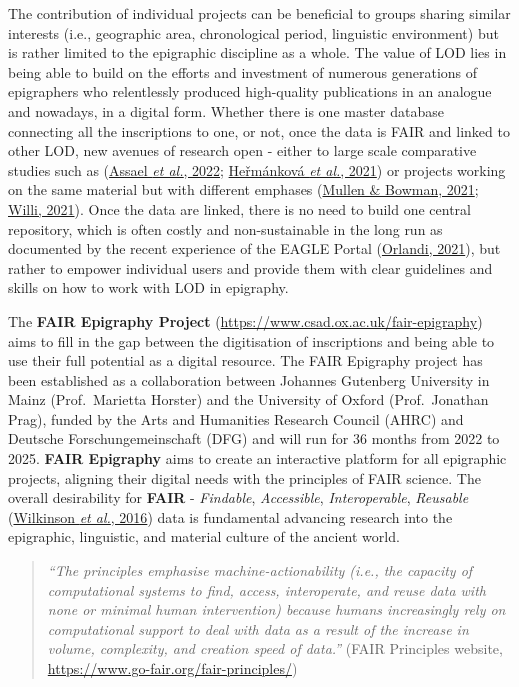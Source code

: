 \documentclass[
  10pt,
]{article}
\begin{document}
The contribution of individual projects can be beneficial to groups
sharing similar interests (i.e., geographic area, chronological period,
linguistic environment) but is rather limited to the epigraphic
discipline as a whole. The value of LOD lies in being able to build on
the efforts and investment of numerous generations of epigraphers who
relentlessly produced high-quality publications in an analogue and
nowadays, in a digital form. Whether there is one master database
connecting all the inscriptions to one, or not, once the data is FAIR
and linked to other LOD, new avenues of research open - either to large
scale comparative studies such as
(\protect\hyperlink{ref-assael_restoring_2022}{Assael \emph{et al.},
2022}; \protect\hyperlink{ref-hermankova_inscriptions_2021}{Heřmánková
\emph{et al.}, 2021}) or projects working on the same material but with
different emphases (\protect\hyperlink{ref-mullen_manual_2021}{Mullen \&
Bowman, 2021}; \protect\hyperlink{ref-willi_manual_2021}{Willi, 2021}).
Once the data are linked, there is no need to build one central
repository, which is often costly and non-sustainable in the long run as
documented by the recent experience of the EAGLE Portal
(\protect\hyperlink{ref-orlandi_digital_2021}{Orlandi, 2021}), but
rather to empower individual users and provide them with clear
guidelines and skills on how to work with LOD in epigraphy.

The \textbf{FAIR Epigraphy Project}
(\url{https://www.csad.ox.ac.uk/fair-epigraphy}) aims to fill in the gap
between the digitisation of inscriptions and being able to use their
full potential as a digital resource. The FAIR Epigraphy project has
been established as a collaboration between Johannes Gutenberg
University in Mainz (Prof.~Marietta Horster) and the University of
Oxford (Prof.~Jonathan Prag), funded by the Arts and Humanities Research
Council (AHRC) and Deutsche Forschungemeinschaft (DFG) and will run for
36 months from 2022 to 2025. \textbf{FAIR Epigraphy} aims to create an
interactive platform for all epigraphic projects, aligning their digital
needs with the principles of FAIR science. The overall desirability for
\textbf{FAIR} - \emph{Findable}, \emph{Accessible},
\emph{Interoperable}, \emph{Reusable}
(\protect\hyperlink{ref-wilkinson_fair_2016}{Wilkinson \emph{et al.},
2016}) data is fundamental advancing research into the epigraphic,
linguistic, and material culture of the ancient world.

\begin{quote}
\emph{``The principles emphasise machine-actionability (i.e., the
capacity of computational systems to find, access, interoperate, and
reuse data with none or minimal human intervention) because humans
increasingly rely on computational support to deal with data as a result
of the increase in volume, complexity, and creation speed of data.''}
(FAIR Principles website,
\url{https://www.go-fair.org/fair-principles/})
\end{quote}
\end{document}
